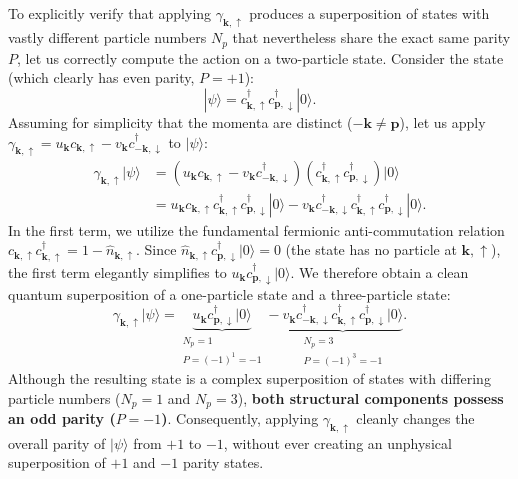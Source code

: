 \begin{example}
    To explicitly verify that applying \( \gamma_{\mathbf{k},\uparrow} \) produces a superposition of states with vastly different particle numbers \( N_p \) that nevertheless share the exact same parity \( P \), let us correctly compute the action on a two-particle state. Consider the state (which clearly has even parity, \( P = +1 \)):
    \[
        |\psi\rangle = c_{\mathbf{k},\uparrow}^\dagger c_{\mathbf{p},\downarrow}^\dagger |0\rangle.
    \]
    Assuming for simplicity that the momenta are distinct (\( -\mathbf{k} \neq \mathbf{p} \)), let us apply \( \gamma_{\mathbf{k},\uparrow} = u_{\mathbf{k}} c_{\mathbf{k},\uparrow} - v_{\mathbf{k}} c_{-\mathbf{k},\downarrow}^\dagger \) to \( |\psi\rangle \):
    \[
        \begin{aligned}
            \gamma_{\mathbf{k},\uparrow} |\psi\rangle & = \left( u_{\mathbf{k}} c_{\mathbf{k},\uparrow} - v_{\mathbf{k}} c_{-\mathbf{k},\downarrow}^\dagger \right) \left( c_{\mathbf{k},\uparrow}^\dagger c_{\mathbf{p},\downarrow}^\dagger \right) |0\rangle                                                \\
                                                      & = u_{\mathbf{k}} c_{\mathbf{k},\uparrow} c_{\mathbf{k},\uparrow}^\dagger c_{\mathbf{p},\downarrow}^\dagger |0\rangle - v_{\mathbf{k}} c_{-\mathbf{k},\downarrow}^\dagger c_{\mathbf{k},\uparrow}^\dagger c_{\mathbf{p},\downarrow}^\dagger |0\rangle.
        \end{aligned}
    \]
    In the first term, we utilize the fundamental fermionic anti-commutation relation \( c_{\mathbf{k},\uparrow} c_{\mathbf{k},\uparrow}^\dagger = 1 - \hat{n}_{\mathbf{k},\uparrow} \). Since \( \hat{n}_{\mathbf{k},\uparrow} c_{\mathbf{p},\downarrow}^\dagger |0\rangle = 0 \) (the state has no particle at \( \mathbf{k},\uparrow \)), the first term elegantly simplifies to \( u_{\mathbf{k}} c_{\mathbf{p},\downarrow}^\dagger |0\rangle \). We therefore obtain a clean quantum superposition of a one-particle state and a three-particle state:
    \[
        \gamma_{\mathbf{k},\uparrow} |\psi\rangle = \underbrace{u_{\mathbf{k}} c_{\mathbf{p},\downarrow}^\dagger |0\rangle}_{\substack{N_p = 1 \\ P = (-1)^1 = -1}} - \underbrace{v_{\mathbf{k}} c_{-\mathbf{k},\downarrow}^\dagger c_{\mathbf{k},\uparrow}^\dagger c_{\mathbf{p},\downarrow}^\dagger |0\rangle}_{\substack{N_p = 3 \\ P = (-1)^3 = -1}}.
    \]
    Although the resulting state is a complex superposition of states with differing particle numbers (\( N_p = 1 \) and \( N_p = 3 \)), \textbf{both structural components possess an odd parity (\( P = -1 \))}. Consequently, applying \( \gamma_{\mathbf{k},\uparrow} \) cleanly changes the overall parity of \( |\psi\rangle \) from \( +1 \) to \( -1 \), without ever creating an unphysical superposition of \( +1 \) and \( -1 \) parity states.
\end{example}

